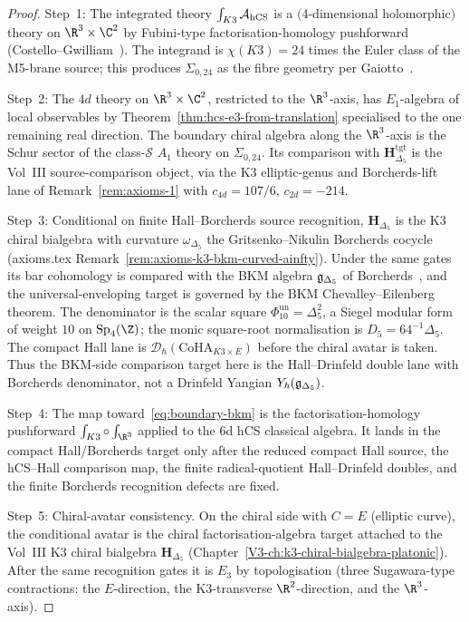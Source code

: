 \begin{proof}
Step~1: The integrated theory $\int_{K3}\mathcal{A}_{\mathrm{hCS}}$ is a
$(4$-dimensional holomorphic$)$ theory on $\R^3\times\C^2$ by
Fubini-type factorisation-homology pushforward
(Costello--Gwilliam~\cite[Ch.\,3,\,\S3.6]{CostelloGwilliam2017}). The
integrand is $\chi(K3) = 24$ times the Euler class of the M5-brane
source; this produces $\Sigma_{0,24}$ as the fibre geometry per
Gaiotto~\cite{Gaiotto2009}.

Step~2: The $4d$ theory on $\R^3\times\C^2$, restricted to the
$\R^3$-axis, has $E_1$-algebra of local observables by
Theorem~\ref{thm:hcs-e3-from-translation} specialised to the
one remaining real direction. The boundary chiral algebra along the
$\R^3$-axis is the Schur sector of the class-$\mathcal S$ $A_1$ theory
on $\Sigma_{0,24}$. Its comparison with
$\mathbf{H}_{\Delta_5}^{\mathrm{tgt}}$ is the Vol~III
source-comparison object, via the K3 elliptic-genus and
Borcherds-lift lane of
Remark~\ref{rem:axioms-1} with
$c_{4d} = 107/6,\,c_{2d} = -214$.

Step~3: Conditional on finite Hall--Borcherds source recognition,
$\mathbf H_{\Delta_5}$ is the K3 chiral bialgebra with curvature
$\omega_{\Delta_5}$ the Gritsenko--Nikulin Borcherds cocycle
(axioms.tex Remark~\ref{rem:axioms-k3-bkm-curved-ainfty}). Under the
same gates its bar cohomology is compared with the BKM algebra
$\mathfrak{g}_{\Delta_5}$ of Borcherds~\cite{Borcherds98}, and the
universal-enveloping target is governed by the BKM
Chevalley--Eilenberg theorem.
The denominator is the scalar square
$\Phi_{10}^{\mathrm{un}}=\Delta_5^2$, a Siegel modular form of
weight $10$ on $\mathrm{Sp}_4(\Z)$; the monic square-root
normalisation is $D_5=64^{-1}\Delta_5$.
The compact Hall lane is
$\mathcal D_\hbar(\mathrm{CoHA}_{K3\times E})$ before the chiral avatar is
taken. Thus the BKM-side comparison target here is the
Hall--Drinfeld double lane
with Borcherds denominator, not a Drinfeld Yangian
$Y_\hbar(\mathfrak{g}_{\Delta_5})$.

Step~4: The map toward~\eqref{eq:boundary-bkm} is the
factorisation-homology pushforward
$\int_{K3}\circ\int_{\R^3}$ applied to the 6d hCS classical algebra.
It lands in the compact Hall/Borcherds target only after the reduced
compact Hall source, the hCS--Hall comparison map, the finite
radical-quotient Hall--Drinfeld doubles, and the finite Borcherds
recognition defects are fixed.

Step~5: Chiral-avatar consistency. On the chiral side with
$C = E$ (elliptic curve), the conditional avatar is the chiral
factorisation-algebra target attached to the Vol~III K3 chiral
bialgebra $\mathbf H_{\Delta_5}$
(Chapter~\ref{V3-ch:k3-chiral-bialgebra-platonic}). After the same
recognition gates it is $E_3$ by topologisation (three Sugawara-type
contractions: the $E$-direction, the K3-transverse $\R^2$-direction,
and the $\R^3$-axis).
\end{proof}


